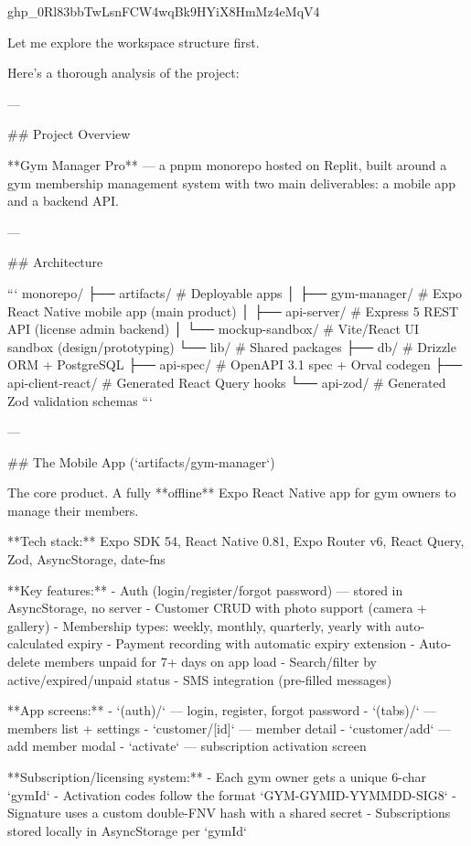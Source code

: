 
 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




Let me explore the workspace structure first.

Here's a thorough analysis of the project:

---

## Project Overview

**Gym Manager Pro** — a pnpm monorepo hosted on Replit, built around a gym membership management system with two main deliverables: a mobile app and a backend API.

---

## Architecture

```
monorepo/
├── artifacts/          # Deployable apps
│   ├── gym-manager/    # Expo React Native mobile app (main product)
│   ├── api-server/     # Express 5 REST API (license admin backend)
│   └── mockup-sandbox/ # Vite/React UI sandbox (design/prototyping)
└── lib/                # Shared packages
    ├── db/             # Drizzle ORM + PostgreSQL
    ├── api-spec/       # OpenAPI 3.1 spec + Orval codegen
    ├── api-client-react/ # Generated React Query hooks
    └── api-zod/        # Generated Zod validation schemas
```

---

## The Mobile App (`artifacts/gym-manager`)

The core product. A fully **offline** Expo React Native app for gym owners to manage their members.

**Tech stack:** Expo SDK 54, React Native 0.81, Expo Router v6, React Query, Zod, AsyncStorage, date-fns

**Key features:**
- Auth (login/register/forgot password) — stored in AsyncStorage, no server
- Customer CRUD with photo support (camera + gallery)
- Membership types: weekly, monthly, quarterly, yearly with auto-calculated expiry
- Payment recording with automatic expiry extension
- Auto-delete members unpaid for 7+ days on app load
- Search/filter by active/expired/unpaid status
- SMS integration (pre-filled messages)

**App screens:**
- `(auth)/` — login, register, forgot password
- `(tabs)/` — members list + settings
- `customer/[id]` — member detail
- `customer/add` — add member modal
- `activate` — subscription activation screen

**Subscription/licensing system:**
- Each gym owner gets a unique 6-char `gymId`
- Activation codes follow the format `GYM-{GYMID}-{YYMMDD}-{SIG8}`
- Signature uses a custom double-FNV hash with a shared secret
- Subscriptions stored locally in AsyncStorage per `gymId`

